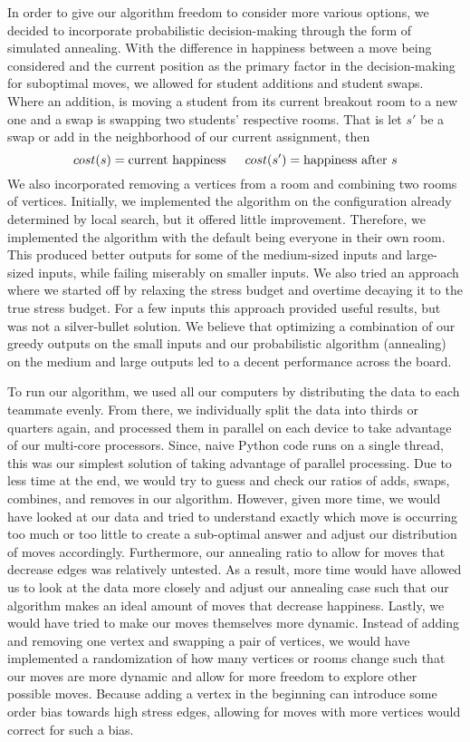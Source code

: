 \documentclass[11pt]{article}
\begin{document}
    In order to give our algorithm freedom to consider more various options, we decided to incorporate probabilistic decision-making through the form of simulated annealing. With the difference in happiness between a move being considered and the current position as the primary factor in the decision-making for suboptimal moves, we allowed for student additions and student swaps. Where an addition, is moving a student from its current breakout room to a new one and a swap is swapping two students' respective rooms. That is let $ s' $ be a swap or add in the neighborhood of our current assignment, then 
    $$ cost(s) = \text{current happiness} \indent cost(s') = \text{happiness after } s  $$
    We also incorporated removing a vertices from a room and combining two rooms of vertices. Initially, we implemented the algorithm on the configuration already determined by local search, but it offered little improvement. Therefore, we implemented the algorithm with the default being everyone in their own room. This produced better outputs for some of the medium-sized inputs and large-sized inputs, while failing miserably on smaller inputs. We also tried an approach where we started off by relaxing the stress budget and overtime decaying it to the true stress budget. For a few inputs this approach provided useful results, but was not a silver-bullet solution. We believe that optimizing a combination of our greedy outputs on the small inputs and our probabilistic algorithm (annealing) on the medium and large outputs led to a decent performance across the board. 

To run our algorithm, we used all our computers by distributing the data to each teammate evenly. From there, we individually split the data into thirds or quarters again, and processed them in parallel on each device to take advantage of our multi-core processors. Since, naive Python code runs on a single thread, this was our simplest solution of taking advantage of parallel processing.
Due to less time at the end, we would try to guess and check our ratios of adds, swaps, combines, and removes in our algorithm. However, given more time, we would have looked at our data and tried to understand exactly which move is occurring too much or too little to create a sub-optimal answer and adjust our distribution of moves accordingly. Furthermore, our annealing ratio to allow for moves that decrease edges was relatively untested. As a result, more time would have allowed us to look at the data more closely and adjust our annealing case such that our algorithm makes an ideal amount of moves that decrease happiness. Lastly, we would have tried to make our moves themselves more dynamic. Instead of adding and removing one vertex and swapping a pair of vertices, we would have implemented a randomization of how many vertices or rooms change such that our moves are more dynamic and allow for more freedom to explore other possible moves. Because adding a vertex in the beginning can introduce some order bias towards high stress edges, allowing for moves with more vertices would correct for such a bias. 
\end{document}
